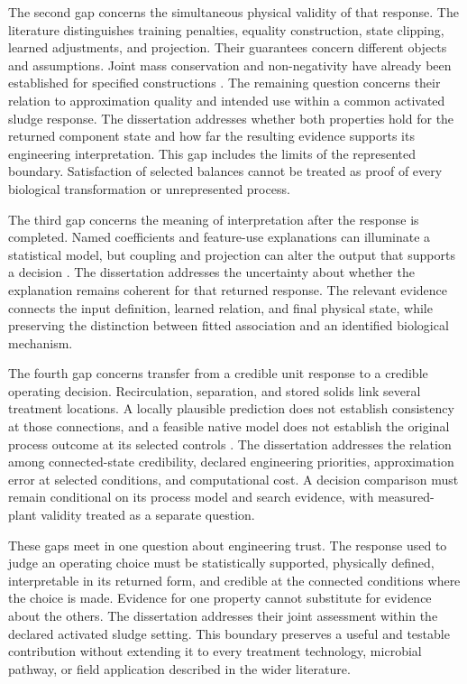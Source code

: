 The second gap concerns the simultaneous physical validity of that response. The literature distinguishes training penalties, equality construction, state clipping, learned adjustments, and projection. Their guarantees concern different objects and assumptions. Joint mass conservation and non-negativity have already been established for specified constructions \citep{KircherVotsmeier2025,Selerio2026}. The remaining question concerns their relation to approximation quality and intended use within a common activated sludge response. The dissertation addresses whether both properties hold for the returned component state and how far the resulting evidence supports its engineering interpretation. This gap includes the limits of the represented boundary. Satisfaction of selected balances cannot be treated as proof of every biological transformation or unrepresented process.

The third gap concerns the meaning of interpretation after the response is completed. Named coefficients and feature-use explanations can illuminate a statistical model, but coupling and projection can alter the output that supports a decision \citep{Rudin2019,Shen2023}. The dissertation addresses the uncertainty about whether the explanation remains coherent for that returned response. The relevant evidence connects the input definition, learned relation, and final physical state, while preserving the distinction between fitted association and an identified biological mechanism.

The fourth gap concerns transfer from a credible unit response to a credible operating decision. Recirculation, separation, and stored solids link several treatment locations. A locally plausible prediction does not establish consistency at those connections, and a feasible native model does not establish the original process outcome at its selected controls \citep{Alex2008,Pedrozo2025,Zhang2026}. The dissertation addresses the relation among connected-state credibility, declared engineering priorities, approximation error at selected conditions, and computational cost. A decision comparison must remain conditional on its process model and search evidence, with measured-plant validity treated as a separate question.

These gaps meet in one question about engineering trust. The response used to judge an operating choice must be statistically supported, physically defined, interpretable in its returned form, and credible at the connected conditions where the choice is made. Evidence for one property cannot substitute for evidence about the others. The dissertation addresses their joint assessment within the declared activated sludge setting. This boundary preserves a useful and testable contribution without extending it to every treatment technology, microbial pathway, or field application described in the wider literature.
